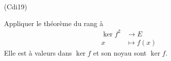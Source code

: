 \begin{tiny}(Cdi19)\end{tiny} Appliquer le théorème du rang à
\[
  \begin{aligned}
    \ker f^2 &\rightarrow E \\x &\mapsto f(x)
  \end{aligned}
\]
Elle est à valeurs dans $\ker f$ et son noyau sont $\ker f$.
